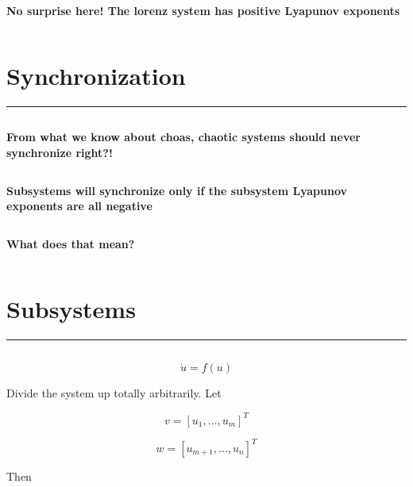 \documentclass{article}
\begin{document}
    \begin{center}
    \end{center}
    { \hspace*{\fill} \\}
    
    \textbf{No surprise here! The lorenz system has positive Lyapunov
exponents}

    $\:$

\section{Synchronization}\label{synchronization}

\begin{center}\rule{3in}{0.4pt}\end{center}

$\:$

\textbf{From what we know about choas, chaotic systems should never
synchronize right?!}

$\:$

\textbf{Subsystems will synchronize only if the subsystem Lyapunov
exponents are all negative}

$\:$

\textbf{What does that mean?}

$\:$

\section{\textbf{Subsystems}}\label{subsystems}

\begin{center}\rule{3in}{0.4pt}\end{center}

$\:$

\begin{equation}
\dot{u} = f(u)
\end{equation}

Divide the system up totally arbitrarily. Let

\begin{equation}
v = [u_1, ..., u_m]^T
\end{equation}

\begin{equation}
w = [u_{m+1},...,u_n]^T
\end{equation}

Then
\end{document}
